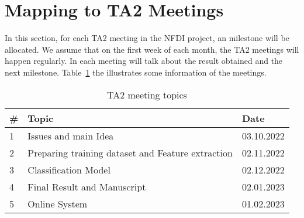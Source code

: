 \documentclass[a4paper]{article}
\begin{document}
    \section{Mapping to TA2 Meetings}\label{sec:ta2}
    In this section, for each TA2 meeting in the NFDI project, an milestone will be allocated.
    We assume that on the first week of each month, the TA2 meetings will happen regularly.
    In each meeting will talk about the result obtained and the next milestone.
    Table~\ref{tab:ta2} the illustrates some information of the meetings.
    \begin{table}[h]\label{tab:ta2}
        \centering
        \caption{TA2 meeting topics}
        \begin{tabular}{lll}
            \# & Topic                                             & Date       \\ \hline
            1  & Issues and main Idea                              & 03.10.2022 \\
            2  & Preparing training dataset and Feature extraction & 02.11.2022 \\
            3  & Classification Model                              & 02.12.2022 \\
            4  & Final Result and Manuscript                       & 02.01.2023 \\
            5  & Online System                                     & 01.02.2023 \\ \hline
        \end{tabular}
    \end{table}

    
    
\end{document}
